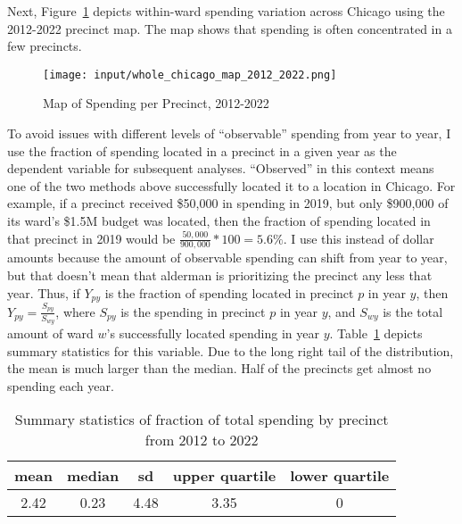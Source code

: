 Next, Figure~\ref{fig:spending_map} depicts within-ward spending variation across Chicago using the 2012-2022 precinct map. 
The map shows that spending is often concentrated in a few precincts.

\begin{figure}[H]
    \centering
    \texttt{[image: input/whole\_chicago\_map\_2012\_2022.png]}
    \caption{Map of Spending per Precinct, 2012-2022}
    \label{fig:spending_map}
\end{figure}

To avoid issues with different levels of ``observable'' spending from year to year, I use the fraction of spending located in a precinct in a given year as the dependent variable for subsequent analyses.
``Observed'' in this context means one of the two methods above successfully located it to a location in Chicago.
For example, if a precinct received \$50,000 in spending in 2019, but only \$900,000 of its ward's \$1.5M budget was located, then the fraction of spending located in that precinct in 2019  would be $\frac{50,000}{900,000}*100 =5.6\%$.
I use this instead of dollar amounts because the amount of observable spending can shift from year to year, but that doesn't mean that alderman is prioritizing the precinct any less that year.
Thus, if $Y_{py}$ is the fraction of spending located in precinct $p$ in year $y$, then $Y_{py} = \frac{S_{py}}{S_{wy}}$, where $S_{py}$ is the spending in precinct $p$ in year $y$, and $S_{wy}$ is the total amount of ward $w$'s successfully located spending in year $y$.
Table~\ref{summary_stats} depicts summary statistics for this variable.
Due to the long right tail of the distribution, the mean is much larger than the median.
Half of the precincts get almost no spending each year.

\begin{table}[H]
\caption{Summary statistics of fraction of total spending by precinct from 2012 to 2022}\label{summary_stats}
\centering
\begin{tabular}[t]{ccccc}
\toprule
mean & median & sd & upper quartile & lower quartile\\
\midrule
2.42 & 0.23 & 4.48 & 3.35 & 0\\
\bottomrule
\end{tabular}
\end{table}